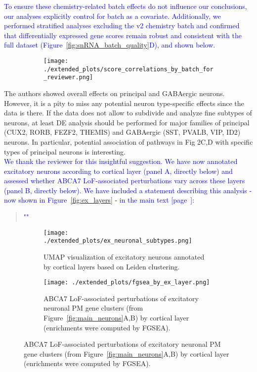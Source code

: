 \textcolor{blue}{To ensure these chemistry-related batch effects do not influence our conclusions, our analyses explicitly control for batch as a covariate. Additionally, we performed stratified analyses excluding the v2 chemistry batch and confirmed that differentially expressed gene scores remain robust and consistent with the full dataset (Figure~\ref{fig:snRNA_batch_quality}D), and shown below.}

\begin{figure}[H]
	\begin{subfigure}[t]{\textwidth}
	\texttt{[image: ./extended\_plots/score\_correlations\_by\_batch\_for\_reviewer.png]}        
	\end{subfigure}   
\end{figure}

The authors showed overall effects on principal and GABAergic neurons. However, it is a pity to miss any potential neuron type-specific effects since the data is there. If the data does not allow to subdivide and analyze fine subtypes of neurons, at least DE analysis should be performed for major families of principal (CUX2, RORB, FEZF2, THEMIS) and GABAergic (SST, PVALB, VIP, ID2) neurons. In particular, potential association of pathways in Fig 2C,D with specific types of principal neurons is interesting.\\
\textcolor{blue}{We thank the reviewer for this insightful suggestion. We have now annotated excitatory neurons according to cortical layer (panel A, directly below) and assessed whether ABCA7 LoF-associated perturbations vary across these layers (panel B, directly below). We have included a statement describing this analysis - now shown in Figure~\ref{fig:ex_layers} - in the main text [page~\pageref{quoteLayer-label}]:}

\begin{quote}
	\textcolor{blue}{"\quoteLayer"}
\end{quote}

\begin{figure}[H]
	\centering
	\begin{subfigure}[t]{.5\textwidth}
	\caption{UMAP visualization of excitatory neurons annotated by cortical layers based on Leiden clustering.}
	\texttt{[image: ./extended\_plots/ex\_neuronal\_subtypes.png]}        
	\end{subfigure} 
	\begin{subfigure}[t]{\textwidth}
	\caption{ABCA7 LoF-associated perturbations of excitatory neuronal PM gene clusters (from Figure~\ref{fig:main_neurons}A,B) by cortical layer (enrichments were computed by FGSEA).}
	\texttt{[image: ./extended\_plots/fgsea\_by\_ex\_layer.png]}        
	\end{subfigure} 
\end{figure}


